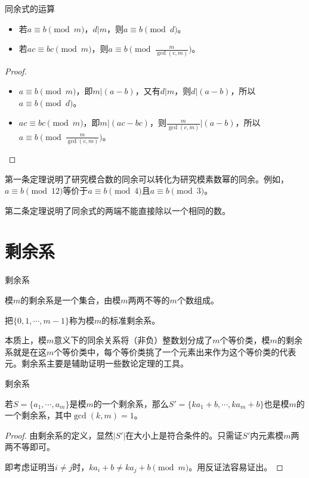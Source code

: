 \documentclass{ctexbeamer}        %
\begin{document}
\begin{frame}{同余式的运算}
\begin{theorem}[更换模数]
    \begin{itemize}
		\item 若$a \equiv b \pmod m$，$d|m$，则$a \equiv b \pmod d$。
		\item 若$ac \equiv bc \pmod m$，则$a \equiv b \pmod {\frac{m}{\gcd(c,m)}}$。
	\end{itemize}
\end{theorem}
\begin{proof}
	\begin{itemize}
    	\item $a \equiv b \pmod m$，即$m|(a-b)$，又有$d|m$，则$d|(a-b)$，所以$a \equiv b \pmod d$。
    	\item $ac \equiv bc \pmod m$，即$m|(ac-bc)$，则$\frac{m}{\gcd(c,m)}|(a-b)$，所以$a \equiv b \pmod {\frac{m}{\gcd(c,m)}}$。
    \end{itemize}
\end{proof}
第一条定理说明了研究模合数的同余可以转化为研究模素数幂的同余。例如，$a \equiv b \pmod{12}$等价于$a \equiv b \pmod 4$且$a \equiv b \pmod 3$。

第二条定理说明了同余式的两端不能直接除以一个相同的数。
\end{frame}

\section{剩余系}
\begin{frame}{剩余系}

\begin{definition}[剩余系]
    模$m$的剩余系是一个集合，由模$m$两两不等的$m$个数组成。

	把$\lbrace 0,1,\cdots,m-1 \rbrace$称为模$m$的标准剩余系。
\end{definition}

本质上，模$m$意义下的同余关系将（非负）整数划分成了$m$个等价类，模$m$的剩余系就是在这$m$个等价类中，每个等价类挑了一个元素出来作为这个等价类的代表元。剩余系主要是辅助证明一些数论定理的工具。

\end{frame}

\begin{frame}{剩余系}

\begin{theorem}[构造剩余系]
    若$S=\lbrace a_1,\cdots,a_m \rbrace$是模$m$的一个剩余系，那么$S'=\lbrace ka_1+b,\cdots,ka_m+b \rbrace$也是模$m$的一个剩余系，其中$\gcd(k,m)=1$。
\end{theorem}

\begin{proof}
	由剩余系的定义，显然$|S'|$在大小上是符合条件的。只需证$S'$内元素模$m$两两不等即可。

	即考虑证明当$i \neq j$时，$ka_i+b \neq ka_j+b \pmod m$。用反证法容易证出。
\end{proof}

\end{frame}
\end{document}
